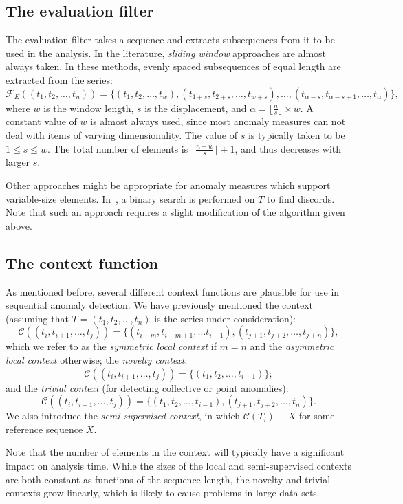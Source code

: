 \subsection{The evaluation filter}

The evaluation filter takes a sequence and extracts subsequences from it to be used in the analysis. In the literature, \emph{sliding window} approaches are almost always taken. In these methods, evenly spaced subsequences of equal length are extracted from the series:
\[
  \mathcal{F}_E((t_1, t_2, \dots, t_n)) = \{(t_1, t_2, \dots, t_w), (t_{1 + s}, t_{2+s}, \dots, t_{w+s}), \dots, (t_{\alpha-s}, t_{\alpha-s+1}, \dots, t_{\alpha})\},
\]
where $w$ is the window length, $s$ is the displacement, and $\alpha = \lfloor \frac{n}{s} \rfloor \times w$. A constant value of $w$ is almost always used, since most anomaly measures can not deal with items of varying dimensionality. The value of $s$ is typically taken to be $1 \leq s \leq w$. The total number of elements is $\lfloor \frac{n-w}{s} \rfloor + 1$, and thus decreases with larger $s$.

Other approaches might be appropriate for anomaly measures which support variable-size elements. In~\cite{keogh2}, a binary search is performed on $T$ to find discords. Note that such an approach requires a slight modification of the algorithm given above.

\subsection{The context function}
As mentioned before, several different context functions are plausible for use in sequential anomaly detection. We have previously mentioned the context (assuming that $T = (t_1, t_2, \dots, t_n)$ is the series under consideration):
\[
    \mathcal{C}((t_i, t_{i+1}, \dots, t_j)) = \{ (t_{i-m}, t_{i-m+1}, \dots t_{i-1}), (t_{j+1}, t_{j+2}, \dots, t_{j+n}) \},
\]
which we refer to as the \emph{symmetric local context} if $m = n$ and the \emph{asymmetric local context} otherwise; the \emph{novelty context}:
\[
    \mathcal{C}((t_i, t_{i+1}, \dots, t_j)) = \{ (t_1, t_2, \dots, t_{i-1}) \};
\]
and the \emph{trivial context} (for detecting collective or point anomalies):
\[
    \mathcal{C}((t_i, t_{i+1}, \dots, t_j)) = \{ (t_1, t_2, \dots, t_{i-1}), (t_{j+1}, t_{j+2}, \dots, t_n) \}.
\]
We also introduce the \emph{semi-supervised context}, in which $\mathcal{C}(T_i) \equiv X$ for some reference sequence $X$.

Note that the number of elements in the context will typically have a significant impact on analysis time. While the sizes of the local and semi-supervised contexts are both constant as functions of the sequence length, the novelty and trivial contexts grow linearly, which is likely to cause problems in large data sets.

